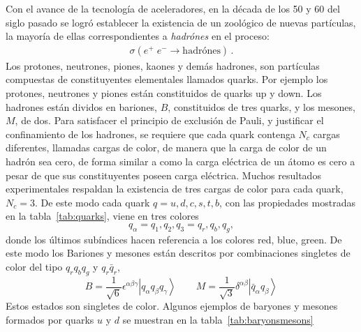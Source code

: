 Con el avance de la tecnología de aceleradores, en la década de los 50 y 60 del siglo pasado se logró establecer la existencia de un zoológico de nuevas partículas, la mayoría de ellas correspondientes a \emph{hadrónes} en el proceso:
\begin{align}
  \sigma(e^+\;e^-\rightarrow \text{hadrónes})\,.
\end{align}
Los protones, neutrones, piones, kaones y demás hadrones, son partículas compuestas de constituyentes elementales llamados quarks. Por ejemplo los protones, neutrones y piones están constituidos de quarks up y down. Los hadrones están dividos en  bariones, $B$, constituidos de tres quarks, y los mesones, $M$, de dos. Para satisfacer el principio de exclusión de Pauli, y justificar el confinamiento de los hadrones, se requiere que cada quark contenga $N_c$ cargas diferentes, llamadas cargas de color, de manera que la carga de color de un hadrón sea cero, de forma similar a como la carga eléctrica de un átomo es cero a pesar de que sus constituyentes poseen carga eléctrica. Muchos resultados experimentales respaldan la existencia de tres cargas de color para cada quark, $N_c=3$. De este modo cada quark $q=u,d,c,s,t,b$, con las propiedades mostradas en la tabla~\ref{tab:quarks}, viene en tres colores
\begin{equation}
  q_\alpha=q_1,q_2,q_3=q_r,q_b,q_g,
\end{equation}
donde los últimos subíndices hacen referencia a los colores red, blue, green. De este modo los Bariones y mesones están descritos por combinaciones singletes de color del tipo $q_r q_b q_g$ y $q_r\bar{q}_r$,
\begin{equation}
\label{eq:199qft}
  B=\frac{1}{\sqrt{6}}\epsilon^{\alpha\beta\gamma}
  \left|q_\alpha q_\beta q_\gamma\right\rangle \qquad M=\frac{1}{\sqrt{3}}\delta^{\alpha\beta}\left|\bar{q}_{\alpha}q_\beta\right\rangle
\end{equation}
Estos estados son singletes de color. Algunos ejemplos de baryones y mesones formados por quarks $u$ y $d$ se muestran en la tabla~\ref{tab:baryonsmesons}


